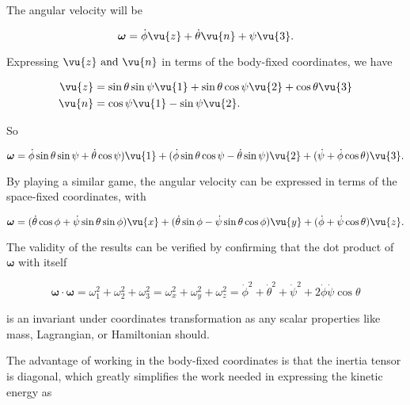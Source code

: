 \documentclass[a4paper,12pt]{report}
\begin{document}
The angular velocity will be 

\begin{equation}
	\boldsymbol{\omega } = \dot{\phi } \vu{z} + \dot{\theta } \vu{n} + \psi \vu{3}. 
\end{equation}

Expressing \(\vu{z} \text{ and } \vu{n} \) in terms of the body-fixed coordinates, we have

\begin{equation}
	\begin{aligned}
		\vu{z} &= \sin \theta \sin \psi \vu{1 } + \sin \theta \cos \psi \vu{2 }+ \cos \theta \vu{3 }\\
		\vu{n} &= \cos \psi \vu{1 } - \sin \psi \vu{2 }.
	\end{aligned}
\end{equation}

So 

\begin{equation}
	\boldsymbol{\omega } = \dot{\phi } \sin \theta \sin \psi  + \dot{\theta } \cos \psi )\vu{1 } + (\dot{\phi } \sin \theta \cos \psi  - \dot{\theta } \sin \psi )\vu{2 }+ (\dot{\psi } + \dot{\phi } \cos \theta )\vu{3 }. 
\end{equation}

By playing a similar game, the angular velocity can be expressed in terms of the space-fixed coordinates, with

\begin{equation}
	\boldsymbol{\omega } = (\dot{\theta } \cos \phi  + \dot{\psi } \sin \theta \sin \phi )\vu{x} + (\dot{\theta } \sin \phi  - \dot{\psi } \sin \theta \cos \phi )\vu{y} + (\dot{\phi } + \dot{\psi } \cos \theta ) \vu{z} .
\end{equation}

The validity of the results can be verified by confirming that the dot product of \(\boldsymbol{\omega } \) with itself

\begin{equation}
	\boldsymbol{\omega } \cdot \boldsymbol{\omega } = \omega _{1} ^2 + \omega _{2} ^2 + \omega _{3} ^2 = \omega _{x} ^2 + \omega _{y} ^2 + \omega _{z} ^2 = \dot{\phi } ^2 + \dot{\theta } ^2 + \dot{\psi } ^2 + 2\dot{\phi } \dot{\psi } \cos \theta 
\end{equation}

is an invariant under coordinates transformation as any scalar properties like mass, Lagrangian, or Hamiltonian should.

The advantage of working in the body-fixed coordinates is that the inertia tensor is diagonal, which greatly simplifies the work needed in expressing the kinetic energy as
\end{document}
